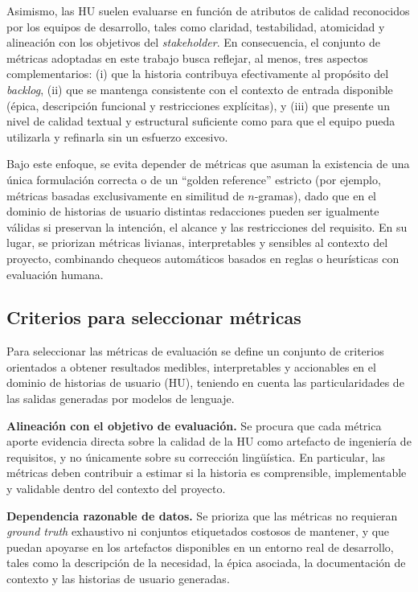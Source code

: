 Asimismo, las HU suelen evaluarse en función de atributos de calidad reconocidos
por los equipos de desarrollo, tales como claridad, testabilidad, atomicidad y
alineación con los objetivos del \textit{stakeholder}. En consecuencia, el
conjunto de métricas adoptadas en este trabajo busca reflejar, al menos, tres
aspectos complementarios: (i) que la historia contribuya efectivamente al
propósito del \textit{backlog}, (ii) que se mantenga consistente con el contexto
de entrada disponible (épica, descripción funcional y restricciones explícitas),
y (iii) que presente un nivel de calidad textual y estructural suficiente como
para que el equipo pueda utilizarla y refinarla sin un esfuerzo excesivo.

Bajo este enfoque, se evita depender de métricas que asuman la existencia de una
única formulación correcta o de un ``golden reference'' estricto (por ejemplo,
métricas basadas exclusivamente en similitud de $n$-gramas), dado que en el
dominio de historias de usuario distintas redacciones pueden ser igualmente
válidas si preservan la intención, el alcance y las restricciones del requisito.
En su lugar, se priorizan métricas livianas, interpretables y sensibles al
contexto del proyecto, combinando chequeos automáticos basados en reglas o
heurísticas con evaluación humana.

\subsection{Criterios para seleccionar métricas}
Para seleccionar las métricas de evaluación se define un conjunto de criterios
orientados a obtener resultados medibles, interpretables y accionables en el
dominio de historias de usuario (HU), teniendo en cuenta las particularidades
de las salidas generadas por modelos de lenguaje.

\textbf{Alineación con el objetivo de evaluación.} Se procura que cada métrica
aporte evidencia directa sobre la calidad de la HU como artefacto de ingeniería
de requisitos, y no únicamente sobre su corrección lingüística. En particular,
las métricas deben contribuir a estimar si la historia es comprensible,
implementable y validable dentro del contexto del proyecto.

\textbf{Dependencia razonable de datos.} Se prioriza que las métricas no requieran
\textit{ground truth} exhaustivo ni conjuntos etiquetados costosos de mantener,
y que puedan apoyarse en los artefactos disponibles en un entorno real de
desarrollo, tales como la descripción de la necesidad, la épica asociada, la
documentación de contexto y las historias de usuario generadas.

